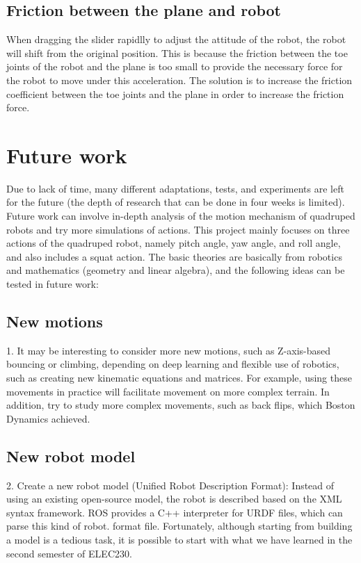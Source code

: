 \subsection{Friction between the plane and robot}
When dragging the slider rapidlly to adjust the attitude of the robot, the robot will shift from the original position. This is because the friction between the toe joints of the robot and the plane is too small to provide the necessary force for the robot to move under this acceleration. The solution is to increase the friction coefficient between the toe joints and the plane in order to increase the friction force.


\section{Future work}
Due to lack of time, many different adaptations, tests, and experiments are left for the future (the depth of research that can be done in four weeks is limited). Future work can involve in-depth analysis of the motion mechanism of quadruped robots and try more simulations of actions.
This project mainly focuses on three actions of the quadruped robot, namely pitch angle, yaw angle, and roll angle, and also includes a squat action. The basic theories are basically from robotics and mathematics (geometry and linear algebra), and the following ideas can be tested in future work:
\subsection{New motions}
1. It may be interesting to consider more new motions, such as Z-axis-based bouncing or climbing, depending on deep learning and flexible use of robotics, such as creating new kinematic equations and matrices. For example, using these movements in practice will facilitate movement on more complex terrain. In addition, try to study more complex movements, such as back flips, which Boston Dynamics achieved.
\subsection{New robot model}
2. Create a new robot model (Unified Robot Description Format): Instead of using an existing open-source model, the robot is described based on the XML syntax framework. ROS provides a C++ interpreter for URDF files, which can parse this kind of robot. format file. Fortunately, although starting from building a model is a tedious task, it is possible to start with what we have learned in the second semester of ELEC230. 


